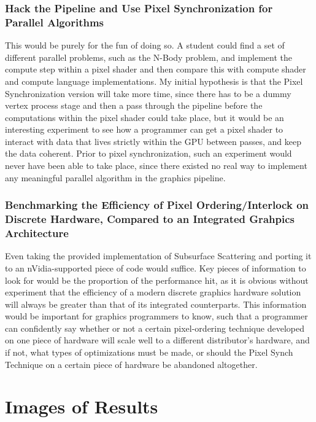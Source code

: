 \documentclass[a4paper, 12pt]{article}
\begin{document}
\subsubsection{Hack the Pipeline and Use Pixel Synchronization for Parallel
Algorithms}

This would be purely for the fun of doing so. A student could find a set of
different parallel problems, such as the N-Body problem, and implement the
compute step within a pixel shader and then compare this with compute shader
and compute language implementations. My initial hypothesis is that the Pixel
Synchronization version will take more time, since there has to be a dummy
vertex process stage and then a pass through the pipeline before the
computations within the pixel shader could take place, but it would be an
interesting experiment to see how a programmer can get a pixel shader to
interact with data that lives strictly within the GPU between passes, and keep
the data coherent. Prior to pixel synchronization, such an experiment would
never have been able to take place, since there existed no real way to
implement any meaningful parallel algorithm in the graphics pipeline.

\subsubsection{Benchmarking the Efficiency of Pixel Ordering/Interlock on Discrete Hardware, Compared to an Integrated Grahpics Architecture}

Even taking the provided implementation of Subsurface Scattering and porting
it to an nVidia-supported piece of code would suffice. Key pieces of
information to look for would be the proportion of the performance hit, as it
is obvious without experiment that the efficiency of a modern discrete
graphics hardware solution will always be greater than that of its integrated
counterparts. This information would be important for graphics programmers to
know, such that a programmer can confidently say whether or not a certain
pixel-ordering technique developed on one piece of hardware will scale well to
a different distributor's hardware, and if not, what types of optimizations
must be made, or should the Pixel Synch Technique on a certain piece of
hardware be abandoned altogether.

\pagebreak



\pagebreak

\section{Images of Results}
\end{document}
